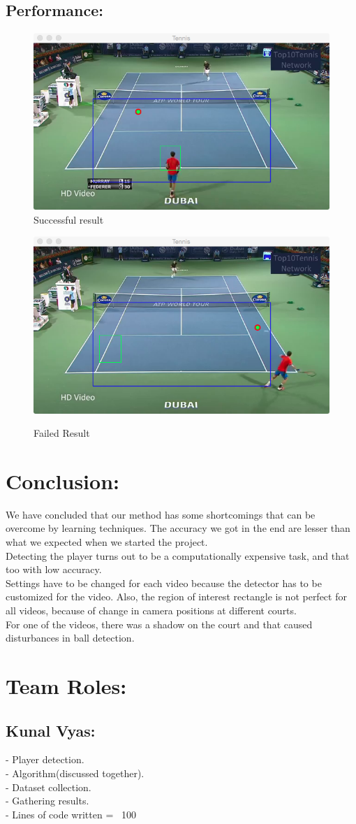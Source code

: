 \documentclass[10.5pt]{proc}
\begin{document}
	\subsection{Performance:}
    \begin{figure}[h]
    \centering
	\includegraphics[width=.47\textwidth]{right.png}\\
	\caption{Successful result}
	\includegraphics[width=.47\textwidth]{failure.png}\\
	\caption{Failed Result}
	\end{figure}
	
	\section{Conclusion:}
	We have concluded that our method has some shortcomings that can be overcome by learning techniques. The accuracy we got in the end are lesser than what we expected when we started the project.\\
	Detecting the player turns out to be a computationally expensive task, and that too with low accuracy.\\
	Settings have to be changed for each video because the detector has to be customized for the video. Also, the region of interest rectangle is not perfect for all videos, because of change in camera positions at different courts.\\
	For one of the videos, there was a shadow on the court and that caused disturbances in ball detection.\\
	\section{Team Roles:}
	\subsection{Kunal Vyas:}
	- Player detection.\\
	- Algorithm(discussed together).\\
	- Dataset collection.\\
	- Gathering results.\\
	- Lines of code written = ~100\\
	
\end{document}
